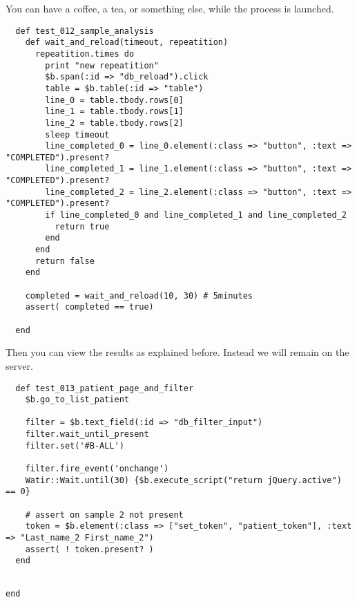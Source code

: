 You can have a coffee, a tea, or something else, while the process is
launched.

\begin{verbatim}
  def test_012_sample_analysis
    def wait_and_reload(timeout, repeatition)
      repeatition.times do
        print "new repeatition"
        $b.span(:id => "db_reload").click
        table = $b.table(:id => "table")
        line_0 = table.tbody.rows[0]
        line_1 = table.tbody.rows[1]
        line_2 = table.tbody.rows[2]
        sleep timeout
        line_completed_0 = line_0.element(:class => "button", :text => "COMPLETED").present?
        line_completed_1 = line_1.element(:class => "button", :text => "COMPLETED").present?
        line_completed_2 = line_2.element(:class => "button", :text => "COMPLETED").present?
        if line_completed_0 and line_completed_1 and line_completed_2
          return true
        end
      end
      return false
    end

    completed = wait_and_reload(10, 30) # 5minutes
    assert( completed == true)

  end

\end{verbatim}

Then you can view the results as explained before.
Instead we will remain on the server.

\begin{verbatim}
  def test_013_patient_page_and_filter
    $b.go_to_list_patient

    filter = $b.text_field(:id => "db_filter_input")
    filter.wait_until_present
    filter.set('#B-ALL')

    filter.fire_event('onchange')
    Watir::Wait.until(30) {$b.execute_script("return jQuery.active") == 0}

    # assert on sample 2 not present
    token = $b.element(:class => ["set_token", "patient_token"], :text => "Last_name_2 First_name_2")
    assert( ! token.present? )
  end

\end{verbatim}


\begin{verbatim}

end
\end{verbatim}